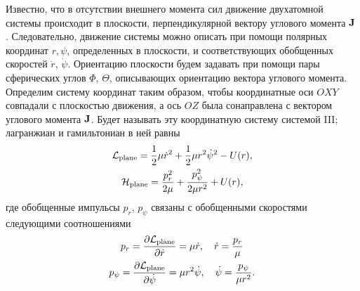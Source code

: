 Известно, что в отсутствии внешнего момента сил движение двухатомной системы происходит в плоскости, перпендикулярной вектору углового момента $\mathbf{J}$ \cite{goldstein}. Следовательно, движение системы можно описать при помощи полярных координат $r, \psi$, определенных в плоскости, и соответствующих обобщенных скоростей $\dot{r}$, $\dot{\psi}$. Ориентацию плоскости будем задавать при помощи пары сферических углов $\Phi$, $\Theta$, описывающих ориентацию вектора углового момента. Определим систему координат таким образом, чтобы координатные оси $OXY$ совпадали с плоскостью движения, а ось $OZ$ была сонаправлена с вектором углового момента $\mathbf{J}$. Будет называть эту координатную систему системой III; лагранжиан и гамильтониан в ней равны 
\begin{gather}
    \mathcal{L}_\text{plane} = \frac{1}{2} \mu \dot{r}^2 + \frac{1}{2} \mu r^2 \dot{\psi}^2 - U(r), \label{two-atom-plane-lagrangian} \\
    \mathcal{H}_\text{plane} = \frac{p_r^2}{2\mu} + \frac{p_\psi^2}{2 \mu r^2} + U(r), \label{two-atom-plane-hamiltonian} 
\end{gather}
%
где обобщенные импульсы $p_r$, $p_\psi$ связаны с обобщенными скоростями следующими соотношениями
\begin{gather}
    p_r = \frac{\partial \mathcal{L}_\text{plane}}{\partial \dot{r}} = \mu \dot{r}, \quad \dot{r} = \frac{p_r}{\mu} \label{two-atom-plane-momenta1} \\
    p_\psi = \frac{\partial \mathcal{L}_\text{plane}}{\partial \dot{\psi}} = \mu r^2 \dot{\psi}, \quad \dot{\psi} = \frac{p_\psi}{\mu r^2}.  \label{two-atom-plane-momenta2}
\end{gather}


